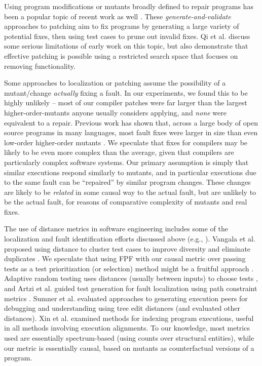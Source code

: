 Using program modifications or mutants broadly defined to repair programs has been a popular topic of recent work as well \cite{GenProg,AutoRep,WeiFix}.  These \emph{generate-and-validate} approaches to patching aim to fix programs by generating a large variety of potential fixes, then using test cases to prune out invalid fixes.  Qi et al. \cite{achour} discuss some serious limitations of early work on this topic, but also demonstrate that effective patching is possible using a restricted search space that focuses on removing functionality.

Some approaches to localization or patching assume the possibility of a mutant/change \emph{actually} fixing a fault.  In our experiments, we found this to be highly unlikely -- most of our compiler patches were far larger than the largest higher-order-mutants \cite{jia2009higher} anyone usually considers applying, and \emph{none} were equivalent to a repair.  Previous work has shown that, across a large body of open source programs in many languages, most fault fixes were larger in size than even low-order higher-order mutants \cite{GopinathMutants}.
We speculate that fixes for compilers may be likely to be even more complex than the average, given that compilers are particularly complex software systems.  
Our primary assumption is simply that similar executions respond similarly to mutants, and in particular executions due to the same fault can be ``repaired'' by similar program changes.  These changes are likely to be \emph{related} in some causal way to the actual fault, but are unlikely to be the actual fault, for reasons of comparative complexity of mutants and real fixes.

The use of distance metrics in software engineering includes some of the localization and fault identification efforts discussed above (e.g., \cite{NearNeighbor,GroceError,ChakiLev,Liu06}).  Vangala et al. proposed using distance to cluster test cases to improve diversity and eliminate duplicates \cite{VangalaDist}.  We speculate that using FPF with our causal metric over passing tests as a test prioritization (or selection) method might be a fruitful approach \cite{YooHarman}.  Adaptive random testing uses distances (usually between inputs) to choose tests \cite{Chen,ARTChen,ISSTAART}, and Artzi et al. guided test generation for fault localization using path constraint metrics \cite{ArtziDirected}.  Sumner et al. evaluated approaches to generating execution peers for debugging and understanding \cite{Sumner2011} using tree edit distances (and evaluated other distances).  Xin et al. \cite{Xin2008} examined methods for indexing program executions, useful in all methods involving execution alignments.  To our knowledge, most metrics used are essentially spectrum-based \cite{RepsSpectra,BallConcept} (using counts over structural entities), while our metric is essentially causal, based on mutants as counterfactual \cite{LewisCause,LewisCount} versions of a program.